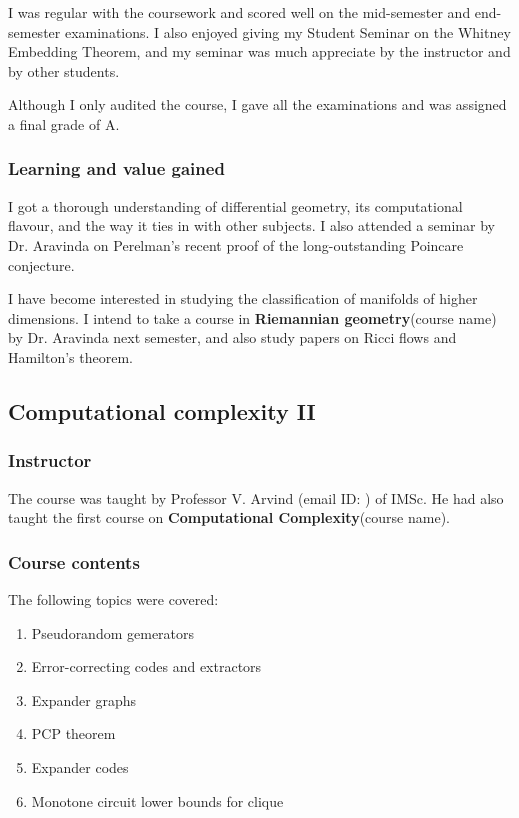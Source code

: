 \documentclass[a4paper]{amsart}
\newcommand{\coursename}[1]{{\bf #1}{\small{(course name)}}}
\begin{document}
I was regular with the coursework and scored well on the mid-semester
and end-semester examinations. I also enjoyed giving my Student Seminar
on  the Whitney Embedding Theorem, and my seminar was much appreciate
by the instructor and by other students.

Although I only audited the course, I gave all the examinations and
was assigned a final grade of A.

\subsubsection{Learning and value gained}

I got a thorough understanding of differential geometry, its computational
flavour, and the way it ties in with other subjects. I also attended
a seminar by Dr. Aravinda on Perelman's recent proof of the long-outstanding
Poincare conjecture.

I have become interested in studying the classification of manifolds
of higher dimensions. I intend to take a course in
\coursename{Riemannian geometry} by Dr. Aravinda next semester, and
also study papers on Ricci flows and Hamilton's theorem.

\subsection{Computational complexity II}

\subsubsection{Instructor}

The course was taught by Professor V. Arvind (email ID:
) of IMSc. He had also taught the first
course on \coursename{Computational Complexity}.

\subsubsection{Course contents}

The following topics were covered:

\begin{enumerate}

\item Pseudorandom gemerators

\item Error-correcting codes and extractors

\item Expander graphs

\item PCP theorem

\item Expander codes

\item Monotone circuit lower bounds for clique
 
\end{enumerate}
\end{document}

